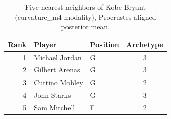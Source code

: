 \begin{table}[htbp]
  \centering\small
  \begin{tabular}{rllc}
    \toprule
    Rank & Player & Position & Archetype \\
    \midrule
    1 & Michael Jordan & G & 3 \\
    2 & Gilbert Arenas & G & 3 \\
    3 & Cuttino Mobley & G & 2 \\
    4 & John Starks & G & 3 \\
    5 & Sam Mitchell & F & 2 \\
    \bottomrule
  \end{tabular}
  \caption{Five nearest neighbors of Kobe Bryant (curvature_m4 modality), Procrustes-aligned posterior mean.}
  \label{tab:Kobe_Bryant_neighbors_curvature_m4}
\end{table}

